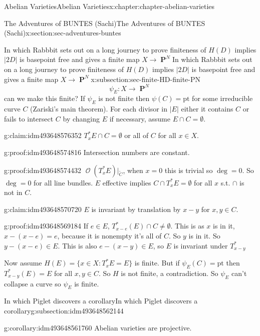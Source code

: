 \documentclass[oneside,10pt,]{book}
\numberwithin{equation}{section}
\newcommand{\sheaf}[1]{\operatorname{\mathcal{#1}}}
\DeclareMathOperator{\PP}{\mathbf{P}}
\begin{document}
\begin{chapterptx}{Abelian Varieties}{}{Abelian Varieties}{}{}{x:chapter:chapter-abelian-varieties}
\begin{sectionptx}{The Adventures of BUNTES (Sachi)}{}{The Adventures of BUNTES (Sachi)}{}{}{x:section:sec-adventures-buntes}
\begin{subsectionptx}{In which Rabbbit sets out on a long journey to prove finiteness of \(H(D)\) implies \(|2D|\) is basepoint free and gives a finite map \(X \to \PP^N\)}{}{In which Rabbbit sets out on a long journey to prove finiteness of \(H(D)\) implies \(|2D|\) is basepoint free and gives a finite map \(X \to \PP^N\)}{}{}{x:subsection:sec-finite-HD-finite-PN}
\begin{equation*}
\psi_E\colon X \to \PP^N
\end{equation*}
can we make this finite? If \(\psi_E\) is not finite then \(\psi(C) = \text{pt}\) for some irreducible curve \(C\) (Zariski's main theorem). For each divisor in \(|E|\) either it contains \(C\) or fails to intersect \(C\) by changing \(E\) if necessary, assume \(E \cap C = \emptyset\).%
\begin{claim}{}{}{g:claim:idm493648576352}%
\(T_x^*E\cap C= \emptyset\) or all of \(C\) for all \(x\in X\).%
\end{claim}
\begin{proofptx}{}{g:proof:idm493648574816}
Intersection numbers are constant.%
\end{proofptx}
\begin{proofptx}{}{g:proof:idm493648574432}
\(\sheaf O(T_x^*E)|_{\widetilde C}\), when \(x=0\) this is trivial so \(\deg =0\). So \(\deg = 0\) for all line bundles. \(E\) effective implies \(C\cap T_x^* E = \emptyset\) for all \(x\) s.t. \(\cap\) is not in \(C\).%
\end{proofptx}
\begin{claim}{}{}{g:claim:idm493648570720}%
\(E\) is invariant by translation by \(x - y\) for \(x,y \in C\).%
\end{claim}
\begin{proofptx}{}{g:proof:idm493648569184}
If \(e \in E\), \(T_{x-e}^*(E) \cap C \ne \emptyset\). This is as \(x\) is in it, \(x-(x-e) =e\), because it is nonempty it's all of \(C\). So \(y\) is in it. So \(y- (x-e) \in E\). This is also \(e - (x-y) \in E\), so \(E\) is invariant under \(T^*_{x-y}\)%
\end{proofptx}
Now assume \(H(E) = \{x\in X: T_x^*E  = E \}\) is finite. But if \(\psi_E(C) = \text{pt}\) then \(T_{x-y}^*(E)  = E\) for all \(x,y\in C\). So \(H\) is not finite, a contradiction. So \(\psi_E\) can't collapse a curve so \(\psi_E\) is finite.%
\end{subsectionptx}
%
%
\typeout{************************************************}
\typeout{************************************************}
%
\begin{subsectionptx}{In which Piglet discovers a corollary}{}{In which Piglet discovers a corollary}{}{}{g:subsection:idm493648562144}
\begin{corollary}{}{}{g:corollary:idm493648561760}%
Abelian varieties are projective.%
\end{corollary}

\end{subsectionptx}
\end{sectionptx}
\end{chapterptx}
\end{document}
